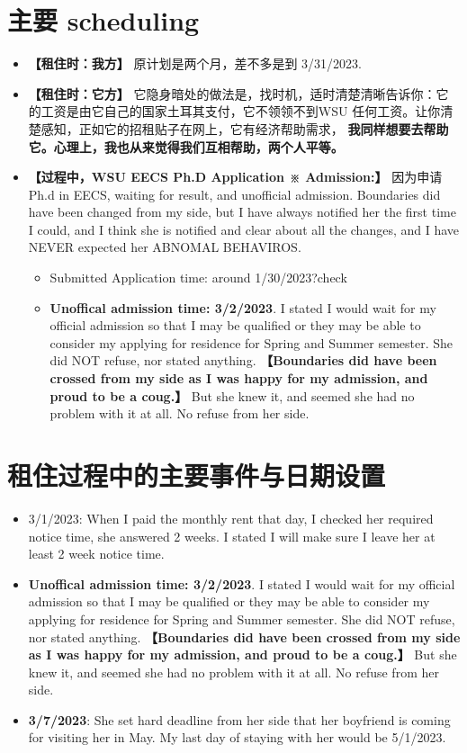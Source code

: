 \documentclass[9pt, b5paper]{article}
\begin{document}
\section{主要 scheduling}
\label{sec-4}
\begin{itemize}
\item \textbf{【租住时：我方】} 原计划是两个月，差不多是到 3/31/2023.
\item \textbf{【租住时：它方】} 它隐身暗处的做法是，找时机，适时清楚清晰告诉你：它的工资是由它自己的国家土耳其支付，它不领领不到WSU 任何工资。让你清楚感知，正如它的招租贴子在网上，它有经济帮助需求， \textbf{我同样想要去帮助它。心理上，我也从来觉得我们互相帮助，两个人平等。}
\item \textbf{【过程中，WSU EECS Ph.D Application ※ Admission:】} 因为申请Ph.d in EECS, waiting for result, and unofficial admission. Boundaries did have been changed from my side, but I have always notified her the first time I could, and I think she is notified and clear about all the changes, and I have NEVER expected her ABNOMAL BEHAVIROS. 
\begin{itemize}
\item Submitted Application time: around 1/30/2023?check
\item \textbf{Unoffical admission time: 3/2/2023}. I stated I would wait for my official admission so that I may be qualified or they may be able to consider my applying for residence for Spring and Summer semester. She did NOT refuse, nor stated anything. \textbf{【Boundaries did have been crossed from my side as I was happy for my admission, and proud to be a coug.】}  But she knew it, and seemed she had no problem with it at all. No refuse from her side.
\end{itemize}
\end{itemize}

\section{租住过程中的主要事件与日期设置}
\label{sec-5}
\begin{itemize}
\item 3/1/2023: When I paid the monthly rent that day, I checked her required notice time, she answered 2 weeks. I stated I will make sure I leave her at least 2 week notice time.
\item \textbf{Unoffical admission time: 3/2/2023}. I stated I would wait for my official admission so that I may be qualified or they may be able to consider my applying for residence for Spring and Summer semester. She did NOT refuse, nor stated anything. \textbf{【Boundaries did have been crossed from my side as I was happy for my admission, and proud to be a coug.】} But she knew it, and seemed she had no problem with it at all. No refuse from her side.
\item \textbf{3/7/2023}: She set hard deadline from her side that her boyfriend is coming for visiting her in May. My last day of staying with her would be 5/1/2023.
\end{itemize}
\end{document}
